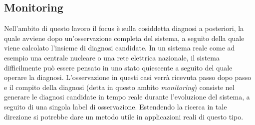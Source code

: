 \subsection{Monitoring}
Nell'ambito di questo lavoro il focus è sulla cosiddetta diagnosi a posteriori, la quale avviene dopo un'osservazione completa del sistema, a seguito della quale viene calcolato l'insieme di diagnosi candidate. In un sistema reale come ad esempio una centrale nucleare o una rete elettrica nazionale, il sistema difficilmente può essere pensato in uno stato quiescente a seguito del quale operare la diagnosi. L'osservazione in questi casi verrà ricevuta passo dopo passo e il compito della diagnosi (detta in questo ambito \emph{monitoring}) consiste nel generare le diagnosi candidate in tempo reale  durante l'evoluzione del sistema, a seguito di una singola label di osservazione. Estendendo la ricerca in tale direzione si potrebbe dare un metodo utile in applicazioni reali di questo tipo.